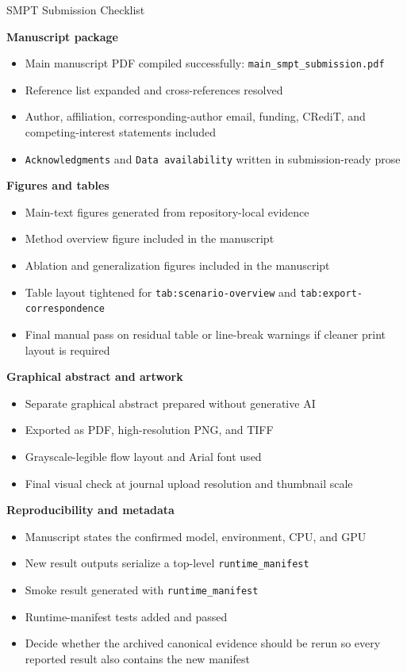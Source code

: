 \documentclass[11pt]{article}
\begin{document}
\begin{center}
{\Large SMPT Submission Checklist}
\end{center}

\textbf{Manuscript package}
\begin{itemize}[leftmargin=1.8em,itemsep=2pt,topsep=2pt]
\item [done] Main manuscript PDF compiled successfully: \texttt{main\_smpt\_submission.pdf}
\item [done] Reference list expanded and cross-references resolved
\item [done] Author, affiliation, corresponding-author email, funding, CRediT, and competing-interest statements included
\item [done] \texttt{Acknowledgments} and \texttt{Data availability} written in submission-ready prose
\end{itemize}

\textbf{Figures and tables}
\begin{itemize}[leftmargin=1.8em,itemsep=2pt,topsep=2pt]
\item [done] Main-text figures generated from repository-local evidence
\item [done] Method overview figure included in the manuscript
\item [done] Ablation and generalization figures included in the manuscript
\item [done] Table layout tightened for \texttt{tab:scenario-overview} and \texttt{tab:export-correspondence}
\item [todo] Final manual pass on residual table or line-break warnings if cleaner print layout is required
\end{itemize}

\textbf{Graphical abstract and artwork}
\begin{itemize}[leftmargin=1.8em,itemsep=2pt,topsep=2pt]
\item [done] Separate graphical abstract prepared without generative AI
\item [done] Exported as PDF, high-resolution PNG, and TIFF
\item [done] Grayscale-legible flow layout and Arial font used
\item [todo] Final visual check at journal upload resolution and thumbnail scale
\end{itemize}

\textbf{Reproducibility and metadata}
\begin{itemize}[leftmargin=1.8em,itemsep=2pt,topsep=2pt]
\item [done] Manuscript states the confirmed model, environment, CPU, and GPU
\item [done] New result outputs serialize a top-level \texttt{runtime\_manifest}
\item [done] Smoke result generated with \texttt{runtime\_manifest}
\item [done] Runtime-manifest tests added and passed
\item [todo] Decide whether the archived canonical evidence should be rerun so every reported result also contains the new manifest
\end{itemize}
\end{document}
